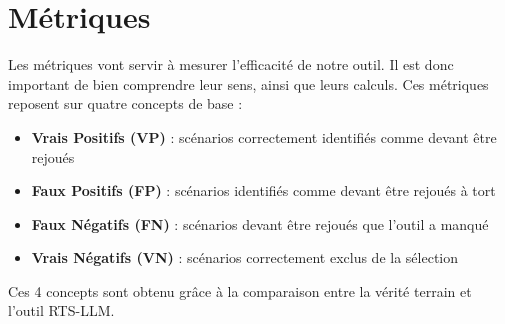 \documentclass[12pt,a4paper]{article}
\begin{document}
\section{Métriques}
Les métriques vont servir à mesurer l'efficacité de notre outil. Il est donc important de bien comprendre leur sens, ainsi que leurs calculs.
Ces métriques reposent sur quatre concepts de base :
    \begin{itemize}
        \item \textbf{Vrais Positifs (VP)} : scénarios correctement identifiés comme devant être rejoués
        \item \textbf{Faux Positifs (FP)} : scénarios identifiés comme devant être rejoués à tort
        \item \textbf{Faux Négatifs (FN)} : scénarios devant être rejoués que l'outil a manqué
        \item \textbf{Vrais Négatifs (VN) }: scénarios correctement exclus de la sélection    
    \end{itemize}

Ces 4 concepts sont obtenu grâce à la comparaison entre la vérité terrain et l'outil RTS-LLM.
\end{document}
